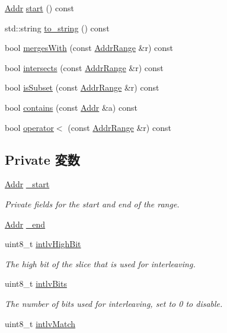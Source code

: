 \begin{DoxyCompactItemize}
\item 
\hyperlink{base_2types_8hh_af1bb03d6a4ee096394a6749f0a169232}{Addr} \hyperlink{classAddrRange_a85325674b7aed05d6b4e40a48563189b}{start} () const 
\item 
std::string \hyperlink{classAddrRange_aa48c39f92bc04eded742f5310c74aafe}{to\_\-string} () const 
\item 
bool \hyperlink{classAddrRange_aa1196b9847a4edf3e67f40a7e4bf63e8}{mergesWith} (const \hyperlink{classAddrRange}{AddrRange} \&r) const 
\item 
bool \hyperlink{classAddrRange_af078c7e4b8ad8c7f3666ebb2fef613da}{intersects} (const \hyperlink{classAddrRange}{AddrRange} \&r) const 
\item 
bool \hyperlink{classAddrRange_a3d9821127a28a036fbcc96d1ba20b8e2}{isSubset} (const \hyperlink{classAddrRange}{AddrRange} \&r) const 
\item 
bool \hyperlink{classAddrRange_aa839dbf0ffc0e871a3f08f1d23d78a18}{contains} (const \hyperlink{base_2types_8hh_af1bb03d6a4ee096394a6749f0a169232}{Addr} \&a) const 
\item 
bool \hyperlink{classAddrRange_a9f850195d97cc5f161ba7e5c880facc8}{operator$<$} (const \hyperlink{classAddrRange}{AddrRange} \&r) const 
\end{DoxyCompactItemize}
\subsection*{Private 変数}
\begin{DoxyCompactItemize}
\item 
\hyperlink{base_2types_8hh_af1bb03d6a4ee096394a6749f0a169232}{Addr} \hyperlink{classAddrRange_a8ae30d144fb49dec55c70ef1274df68a}{\_\-start}
\begin{DoxyCompactList}\small\item\em Private fields for the start and end of the range. \item\end{DoxyCompactList}\item 
\hyperlink{base_2types_8hh_af1bb03d6a4ee096394a6749f0a169232}{Addr} \hyperlink{classAddrRange_a945d5a5b811e52aaf2aa2ca0b1aff5c5}{\_\-end}
\item 
uint8\_\-t \hyperlink{classAddrRange_a4160474d6dec766ee20330ae309e3998}{intlvHighBit}
\begin{DoxyCompactList}\small\item\em The high bit of the slice that is used for interleaving. \item\end{DoxyCompactList}\item 
uint8\_\-t \hyperlink{classAddrRange_a02537b213a36c9f9d57d8c79a0dfb198}{intlvBits}
\begin{DoxyCompactList}\small\item\em The number of bits used for interleaving, set to 0 to disable. \item\end{DoxyCompactList}\item 
uint8\_\-t \hyperlink{classAddrRange_a0d9068b55e0d449e9b8ec483536394a9}{intlvMatch}
\end{DoxyCompactItemize}


